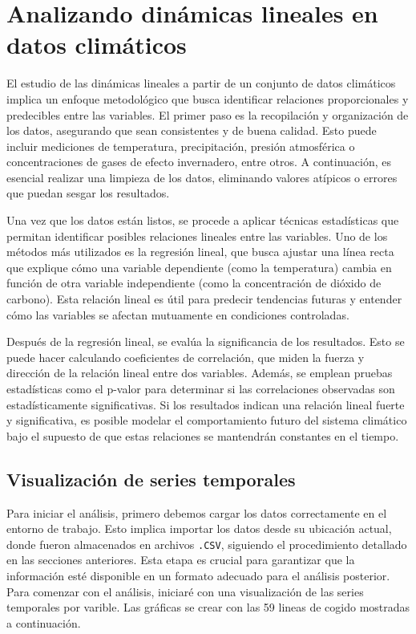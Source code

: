 \documentclass[11pt]{article}
\begin{document}
    \hypertarget{analizando-dinuxe1micas-lineales-en-datos-climuxe1ticos}{%
\section{Analizando dinámicas lineales en datos
climáticos}\label{analizando-dinuxe1micas-lineales-en-datos-climuxe1ticos}}

    El estudio de las dinámicas lineales a partir de un conjunto de datos
climáticos implica un enfoque metodológico que busca identificar
relaciones proporcionales y predecibles entre las variables. El primer
paso es la recopilación y organización de los datos, asegurando que sean
consistentes y de buena calidad. Esto puede incluir mediciones de
temperatura, precipitación, presión atmosférica o concentraciones de
gases de efecto invernadero, entre otros. A continuación, es esencial
realizar una limpieza de los datos, eliminando valores atípicos o
errores que puedan sesgar los resultados.

Una vez que los datos están listos, se procede a aplicar técnicas
estadísticas que permitan identificar posibles relaciones lineales entre
las variables. Uno de los métodos más utilizados es la regresión lineal,
que busca ajustar una línea recta que explique cómo una variable
dependiente (como la temperatura) cambia en función de otra variable
independiente (como la concentración de dióxido de carbono). Esta
relación lineal es útil para predecir tendencias futuras y entender cómo
las variables se afectan mutuamente en condiciones controladas.

Después de la regresión lineal, se evalúa la significancia de los
resultados. Esto se puede hacer calculando coeficientes de correlación,
que miden la fuerza y dirección de la relación lineal entre dos
variables. Además, se emplean pruebas estadísticas como el p-valor para
determinar si las correlaciones observadas son estadísticamente
significativas. Si los resultados indican una relación lineal fuerte y
significativa, es posible modelar el comportamiento futuro del sistema
climático bajo el supuesto de que estas relaciones se mantendrán
constantes en el tiempo.

    \hypertarget{visualizaciuxf3n-de-series-temporales}{%
\subsection{Visualización de series
temporales}\label{visualizaciuxf3n-de-series-temporales}}

    Para iniciar el análisis, primero debemos cargar los datos correctamente
en el entorno de trabajo. Esto implica importar los datos desde su
ubicación actual, donde fueron almacenados en archivos \texttt{.CSV},
siguiendo el procedimiento detallado en las secciones anteriores. Esta
etapa es crucial para garantizar que la información esté disponible en
un formato adecuado para el análisis posterior. Para comenzar con el
análisis, iniciaré con una visualización de las series temporales por
varible. Las gráficas se crear con las 59 lineas de cogido mostradas a
continuación.
\end{document}
